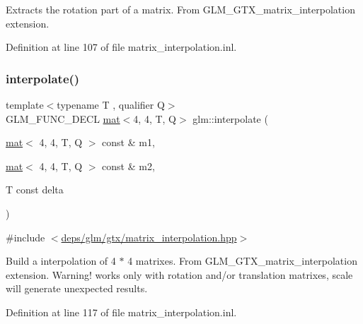 Extracts the rotation part of a matrix. From G\+L\+M\+\_\+\+G\+T\+X\+\_\+matrix\+\_\+interpolation extension. 

Definition at line 107 of file matrix\+\_\+interpolation.\+inl.

\mbox{\label{group__gtx__matrix__interpolation_gad5fc63a2e084000b39f6508ab07421a5}} 
\subsubsection{\texorpdfstring{interpolate()}{interpolate()}}
{\footnotesize\ttfamily template$<$typename T , qualifier Q$>$ \\
G\+L\+M\+\_\+\+F\+U\+N\+C\+\_\+\+D\+E\+CL \hyperlink{structglm_1_1mat}{mat}$<$4, 4, T, Q$>$ glm\+::interpolate (\begin{DoxyParamCaption}\item[{\hyperlink{structglm_1_1mat}{mat}$<$ 4, 4, T, Q $>$ const \&}]{m1,  }\item[{\hyperlink{structglm_1_1mat}{mat}$<$ 4, 4, T, Q $>$ const \&}]{m2,  }\item[{T const}]{delta }\end{DoxyParamCaption})}



{\ttfamily \#include $<$\hyperlink{matrix__interpolation_8hpp}{deps/glm/gtx/matrix\+\_\+interpolation.\+hpp}$>$}

Build a interpolation of 4 $\ast$ 4 matrixes. From G\+L\+M\+\_\+\+G\+T\+X\+\_\+matrix\+\_\+interpolation extension. Warning! works only with rotation and/or translation matrixes, scale will generate unexpected results. 

Definition at line 117 of file matrix\+\_\+interpolation.\+inl.

